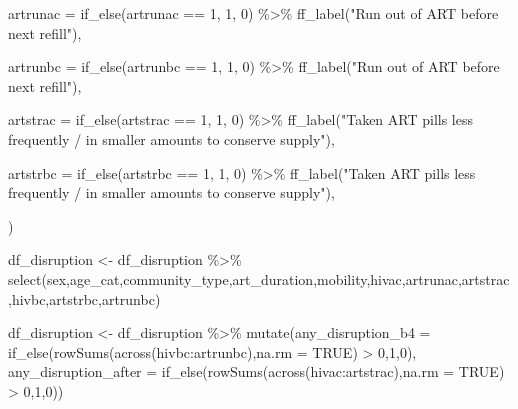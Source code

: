 \documentclass[
  letterpaper,
  DIV=11,
  numbers=noendperiod]{scrartcl}
\newenvironment{Shaded}{\begin{snugshade}}{\end{snugshade}}
\newcommand{\AttributeTok}[1]{\textcolor[rgb]{0.40,0.45,0.13}{#1}}
\newcommand{\ConstantTok}[1]{\textcolor[rgb]{0.56,0.35,0.01}{#1}}
\newcommand{\DecValTok}[1]{\textcolor[rgb]{0.68,0.00,0.00}{#1}}
\newcommand{\FunctionTok}[1]{\textcolor[rgb]{0.28,0.35,0.67}{#1}}
\newcommand{\NormalTok}[1]{\textcolor[rgb]{0.00,0.23,0.31}{#1}}
\newcommand{\OtherTok}[1]{\textcolor[rgb]{0.00,0.23,0.31}{#1}}
\newcommand{\SpecialCharTok}[1]{\textcolor[rgb]{0.37,0.37,0.37}{#1}}
\newcommand{\StringTok}[1]{\textcolor[rgb]{0.13,0.47,0.30}{#1}}
\begin{document}
\begin{Shaded}
\begin{Highlighting}[]
     \AttributeTok{artrunac =} \FunctionTok{if\_else}\NormalTok{(artrunac }\SpecialCharTok{==} \DecValTok{1}\NormalTok{, }\DecValTok{1}\NormalTok{, }\DecValTok{0}\NormalTok{) }\SpecialCharTok{\%\textgreater{}\%} 
       \FunctionTok{ff\_label}\NormalTok{(}\StringTok{"Run out of ART before next refill"}\NormalTok{),}
     
     \AttributeTok{artrunbc =} \FunctionTok{if\_else}\NormalTok{(artrunbc }\SpecialCharTok{==} \DecValTok{1}\NormalTok{, }\DecValTok{1}\NormalTok{, }\DecValTok{0}\NormalTok{) }\SpecialCharTok{\%\textgreater{}\%} 
       \FunctionTok{ff\_label}\NormalTok{(}\StringTok{"Run out of ART before next refill"}\NormalTok{),}
     
     \AttributeTok{artstrac =} \FunctionTok{if\_else}\NormalTok{(artstrac }\SpecialCharTok{==} \DecValTok{1}\NormalTok{, }\DecValTok{1}\NormalTok{, }\DecValTok{0}\NormalTok{) }\SpecialCharTok{\%\textgreater{}\%} 
       \FunctionTok{ff\_label}\NormalTok{(}\StringTok{"Taken ART pills less frequently / in smaller amounts to conserve supply"}\NormalTok{),}
     
     \AttributeTok{artstrbc =} \FunctionTok{if\_else}\NormalTok{(artstrbc }\SpecialCharTok{==} \DecValTok{1}\NormalTok{, }\DecValTok{1}\NormalTok{, }\DecValTok{0}\NormalTok{) }\SpecialCharTok{\%\textgreater{}\%} 
       \FunctionTok{ff\_label}\NormalTok{(}\StringTok{"Taken ART pills less frequently / in smaller amounts to conserve supply"}\NormalTok{),}
     
\NormalTok{    )}
\end{Highlighting}
\end{Shaded}

\begin{Shaded}
\begin{Highlighting}[]
\NormalTok{df\_disruption }\OtherTok{\textless{}{-}}\NormalTok{  df\_disruption }\SpecialCharTok{\%\textgreater{}\%} 
  \FunctionTok{select}\NormalTok{(sex,age\_cat,community\_type,art\_duration,mobility,hivac,artrunac,artstrac,hivbc,artstrbc,artrunbc)}
\end{Highlighting}
\end{Shaded}

\begin{Shaded}
\begin{Highlighting}[]
\NormalTok{df\_disruption }\OtherTok{\textless{}{-}}\NormalTok{  df\_disruption }\SpecialCharTok{\%\textgreater{}\%} 
\FunctionTok{mutate}\NormalTok{(}\AttributeTok{any\_disruption\_b4 =} \FunctionTok{if\_else}\NormalTok{(}\FunctionTok{rowSums}\NormalTok{(}\FunctionTok{across}\NormalTok{(hivbc}\SpecialCharTok{:}\NormalTok{artrunbc),}\AttributeTok{na.rm =} \ConstantTok{TRUE}\NormalTok{) }\SpecialCharTok{\textgreater{}} \DecValTok{0}\NormalTok{,}\DecValTok{1}\NormalTok{,}\DecValTok{0}\NormalTok{),}
\AttributeTok{any\_disruption\_after =} \FunctionTok{if\_else}\NormalTok{(}\FunctionTok{rowSums}\NormalTok{(}\FunctionTok{across}\NormalTok{(hivac}\SpecialCharTok{:}\NormalTok{artstrac),}\AttributeTok{na.rm =} \ConstantTok{TRUE}\NormalTok{) }\SpecialCharTok{\textgreater{}} \DecValTok{0}\NormalTok{,}\DecValTok{1}\NormalTok{,}\DecValTok{0}\NormalTok{))}
\end{Highlighting}
\end{Shaded}
\end{document}
